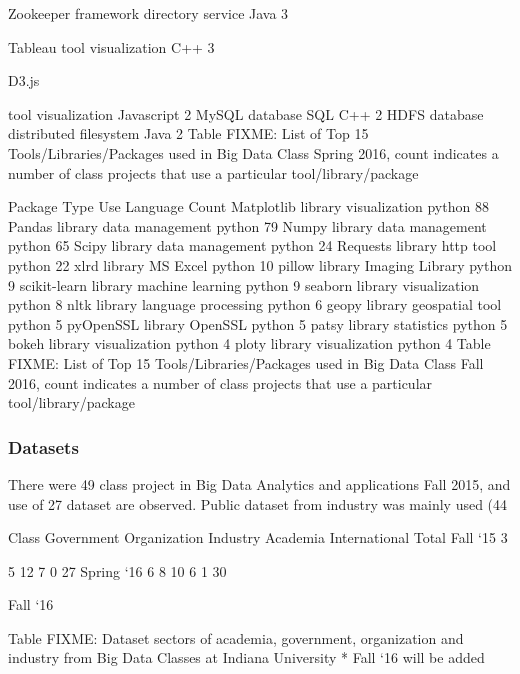 \documentclass[9pt,twocolumn,twoside]{styles/osajnl}
\begin{document}
	Zookeeper
	framework
	directory service
	Java
	3

	Tableau
	tool
	visualization
	C++
	3

	D3.js

	tool
	visualization
	Javascript
	2
	MySQL
	database
	SQL
	C++
	2
	HDFS
	database
	distributed filesystem
	Java
	2
	Table FIXME: List of Top 15 Tools/Libraries/Packages used in Big Data Class Spring 2016, count indicates a number of class projects that use a particular tool/library/package


Package
	Type
	Use
	Language
	Count
	Matplotlib
	library
	visualization
	python
	88
	Pandas
	library
	data management
	python
	79
	Numpy
	library
	data management
	python
	65
	Scipy
	library
	data management
	python
	24
	Requests
	library
	http tool
	python
	22
	xlrd
	library
	MS Excel
	python
	10
	pillow
	library
	Imaging Library
	python
	9
	scikit-learn
	library
	machine learning
	python
	9
	seaborn
	library
	visualization
	python
	8
	nltk
	library
	language processing
	python
	6
	geopy
	library
	geospatial tool
	python
	5
	pyOpenSSL
	library
	OpenSSL
	python
	5
	patsy
	library
	statistics
	python
	5
	bokeh
	library
	visualization
	python
	4
	ploty
	library
	visualization
	python
	4
	Table FIXME: List of Top 15 Tools/Libraries/Packages used in Big Data Class Fall 2016, count indicates a number of class projects that use a particular tool/library/package
\subsubsection{Datasets}

There were 49 class project in Big Data Analytics and applications Fall 2015, and use of 27 dataset are observed. Public dataset from industry was mainly used (44%


Class
	Government
	Organization
	Industry
	Academia
	International
	Total
	Fall ‘15
	3

	5
	12
	7
	0
	27
	Spring ‘16
	6
	8
	10
	6
	1
	30

	Fall ‘16
	

	

	

	

	

	

	Table FIXME: Dataset sectors of academia, government, organization and industry from Big Data Classes at Indiana University * Fall ‘16 will be added
\end{document}
